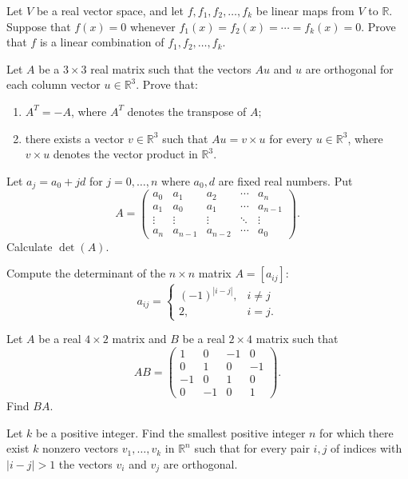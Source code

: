 \documentclass[12pt]{article}
\begin{document}
\begin{problems}
\item Let $V$ be a real vector space, and let $f,f_1,f_2,\dots,f_k$ be linear maps from $V$ to $\mathbb{R}$. Suppose that $f(x)=0$ whenever $f_1(x)=f_2(x)=\cdots=f_k(x)=0$. Prove that $f$ is a linear combination of $f_1,f_2,\dots,f_k$.

\item Let $A$ be a $3\times 3$ real matrix such that the vectors $Au$ and $u$ are orthogonal for each column vector $u\in\mathbb{R}^3$. Prove that:
\begin{enumerate}[label=(\alph*)]
\item $A^T=-A$, where $A^T$ denotes the transpose of $A$;
\item there exists a vector $v\in\mathbb{R}^3$ such that $Au = v\times u$ for every $u\in\mathbb{R}^3$, where $v\times u$ denotes the vector product in $\mathbb{R}^3$.
\end{enumerate}

\item Let $a_j=a_0+jd$ for $j=0,\dots,n$ where $a_0,d$ are fixed real numbers. Put
\[
A = \begin{pmatrix}
a_0 & a_1 & a_2 & \cdots & a_n\\
a_1 & a_0 & a_1 & \cdots & a_{n-1}\\
\vdots & \vdots & \vdots & \ddots & \vdots\\
a_n & a_{n-1} & a_{n-2} & \cdots & a_0
\end{pmatrix}.
\]
Calculate $\det(A)$.

\item Compute the determinant of the $n\times n$ matrix $A=[a_{ij}]$:
\[
a_{ij} = \begin{cases} (-1)^{|i-j|}, & i\ne j\\ 2, & i=j.\end{cases}
\]

\item Let $A$ be a real $4\times 2$ matrix and $B$ be a real $2\times 4$ matrix such that
\[
AB = \begin{pmatrix} 1 & 0 & -1 & 0\\ 0 & 1 & 0 & -1\\ -1 & 0 & 1 & 0\\ 0 & -1 & 0 & 1\end{pmatrix}.
\]
Find $BA$.

\item Let $k$ be a positive integer. Find the smallest positive integer $n$ for which there exist $k$ nonzero vectors $v_1,\dots,v_k$ in $\mathbb{R}^n$ such that for every pair $i,j$ of indices with $|i-j|>1$ the vectors $v_i$ and $v_j$ are orthogonal.


\end{problems}
\end{document}
